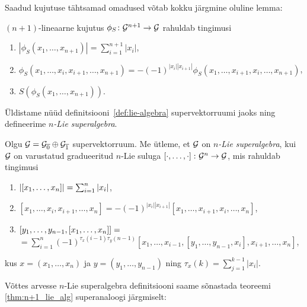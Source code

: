 Saadud kujutuse tähtsamad omadused võtab kokku järgmine oluline lemma:

\begin{lemma}
    $(n+1)$-lineaarne kujutus $\phi_S \colon \mathcal{G}^{n+1} \to \mathcal{G}$
    rahuldab tingimusi
    \begin{enumerate}
        \item $ | \phi_S \left(x_1, \dots, x_{n+1} \right) | =
               \sum_{i=1}^{n+1} |x_i| $,
        \item $ \phi_S \left(x_1, \dots, x_i, x_{i+1}, \dots, x_{n+1} \right) =
               -(-1)^{|x_i| |x_{i+1}|} \phi_S \left(
                    x_1, \dots, x_{i+1}, x_i, \dots, x_{n+1}
                \right) $,
        \item $S \left( \phi_S \left( x_1, \dots, x_{n+1} \right) \right)$.
    \end{enumerate}
\end{lemma}

Üldistame nüüd definitsiooni~\ref{def:lie-algebra} supervektorruumi jaoks
ning defineerime \emph{$n$-Lie superalgebra}.

\begin{dfn}
    Olgu $\mathcal{G} = \mathcal{G}_{\overline{0}} \oplus \mathcal{G}_{\overline{1}}$ 
    supervektorruum. Me ütleme, et $\mathcal{G}$ on
    \emph{$n$-Lie superalgebra}, kui $\mathcal{G}$ on varustatud
    gradueeritud $n$-Lie suluga $\left[ \cdot, \dots, \cdot \right] \colon \mathcal{G}^n \to \mathcal{G}$,
    mis rahuldab tingimusi
    \begin{enumerate}
        \item $\left| \left[ x_1, \dots, x_n \right] \right| = \sum_{i=1}^n |x_i| $,
        \item $\left[ x_1, \dots, x_i, x_{i+1}, \dots, x_n \right] =
            -(-1)^{|x_i| |x_{i+1}|} \left[
                x_1, \dots, x_{i+1}, x_i, \dots, x_n
            \right]$,
        \item $\left[ y_1, \dots, y_{n-1}, \left[ x_1, \dots, x_n \right] \right] = $ \\
            $ = \sum_{i=1}^n (-1)^{\tau_x (i-1) \tau_y (n-1)}
            \left[
                x_1, \dots, x_{i-1},
                \left[ y_1, \dots, y_{n-1}, x_i \right],
                x_{i+1}, \dots, x_n
            \right] $,
    \end{enumerate}
    kus $x = (x_1, \dots, x_n)$ ja $y = (y_1, \dots, y_{n-1})$ ning
    $\tau_x (k) = \sum_{j=1}^{k-1} |x_i|$.
\end{dfn}

Võttes arvesse $n$-Lie superalgebra definitsiooni saame sõnastada 
teoreemi \ref{thm:n+1_lie_alg} superanaloogi järgmiselt:

